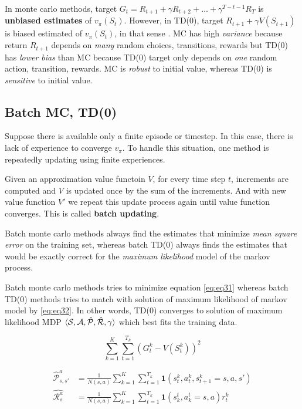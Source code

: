 \documentclass[
	10pt, %
]{article}
\newcommand{\mbb}[1]{\mathbb{#1}}
\newcommand{\mc}[1]{\mathcal{#1}}
\newcommand{\tb}[1]{\textbf{#1}}
\newcommand{\ti}[1]{\textit{#1}}
\numberwithin{equation}{subsection} %
\begin{document}
In monte carlo methods, target $G_t=R_{t+1}+\gamma R_{t+2}+ \dots + \gamma^{T-t-1}R_T$ is \tb{unbiased estimates} of $v_\pi(S_t)$. However, in TD(0), target $R_{t+1}+\gamma V(S_{t+1})$ is biased estimated of $v_\pi(S_t)$, in that sense \bm{$\mbb{E}[R_{t+1} + \gamma V(S_{t+1})|S_t] \neq \mbb{E}[G_{t+1}|S_t] = v_\pi(S_t)$}. MC has high \ti{variance} because return $R_{t+1}$ depends on \ti{many} random choices, transitions, rewards but TD(0) has \ti{lower bias} than MC because TD(0) target only depends on \ti{one} random action, transition, rewards. MC is \ti{robust} to initial value, whereas TD(0) is \ti{sensitive} to initial value.


\subsection{Batch MC, TD(0)}
Suppose there is available only a finite episode or timestep. In this case, there is lack of experience to converge $v_\pi$. To handle this situation, one method is repeatedly updating using finite experiences.

Given an approximation value functoin $V$, for every time step $t$, increments are computed and $V$ is updated once by the sum of the increments. And with new value function $V'$ we repeat this update process again until value function converges. This is called \tb{batch updating}. 

Batch monte carlo methods always find the estimates that minimize \ti{mean square error} on the training set, whereas batch TD(0) always finds the estimates that would be exactly correct for the \ti{maximum likelihood} model of the markov process.

Batch monte carlo methods tries to minimize equation \cref{eq:eq31} whereas batch TD(0) methods tries to match with solution of maximum likelihood of markov model by \cref{eq:eq32}. In other words, TD(0) converges to solution of maximum likelihood MDP $\braket{\mc{S,A,\hat{P}, \hat{R}},\gamma}$ which best fits the training data.

\begin{equation} \label{eq:eq31}
    \sum^K_{k=1} \sum^{T_k}_{t=1} \left(G^k_t - V(S^k_t)\right)^2
\end{equation}

\begin{equation} \label{eq:eq32}
    \begin{aligned}
        \hat{\mc{P}}^a_{s,s'} &= \frac{1}{N(s,a)} \sum^K_{k=1} \sum^{T_k}_{t=1}\mathbf{1}(s^k_t,a^k_t,s^k_{t+1} = s, a, s')\\
        \hat{\mc{R}^a_s} &= \frac{1}{N(s,a)} \sum^K_{k=1} \sum^{T_k}_{t=1}\mathbf{1}(s^t_k,a^t_k = s,a)r^k_t
    \end{aligned}
\end{equation}
\end{document}
